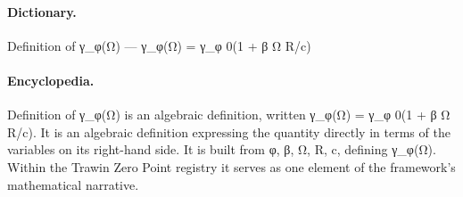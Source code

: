 \paragraph{Dictionary.}
Definition of γ\_φ(Ω) — γ\_φ(Ω) = γ\_φ 0(1 + β Ω R/c)

\paragraph{Encyclopedia.}
Definition of γ\_φ(Ω) is an algebraic definition, written γ\_φ(Ω) = γ\_φ 0(1 + β Ω R/c). It is an algebraic definition expressing the quantity directly in terms of the variables on its right-hand side. It is built from φ, β, Ω, R, c, defining γ\_φ(Ω). Within the Trawin Zero Point registry it serves as one element of the framework's mathematical narrative.
